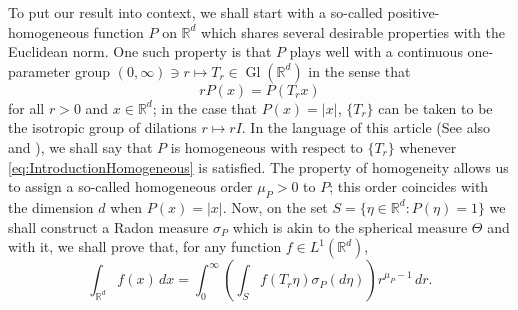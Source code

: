 \documentclass[11pt]{article}
\newtheorem{theorem}{Theorem}[section]
\theoremstyle{remark}
\newcommand\Gl{\operatorname{Gl}} %
\begin{document}
To put our result into context, we shall start with a so-called positive-homogeneous function $P$ on $\mathbb{R}^d$ which shares several desirable properties with the Euclidean norm. One such property is that $P$ plays well with a continuous one-parameter group $(0,\infty)\ni r\mapsto T_r\in\Gl(\mathbb{R}^d)$ in the sense that
\begin{equation}\label{eq:IntroductionHomogeneous}
    rP(x)=P(T_r x)
\end{equation}
for all $r>0$ and $x\in\mathbb{R}^d$; in the case that $P(x)=|x|$, $\{T_r\}$ can be taken to be the isotropic group of dilations $r\mapsto r I$. In the language of this article (See also \cite{Randles2017} and \cite{Randles2017a}), we shall say that $P$ is homogeneous with respect to $\{T_r\}$ whenever \eqref{eq:IntroductionHomogeneous} is satisfied. The property of homogeneity allows us to assign a so-called homogeneous order $\mu_P>0$ to $P$; this order coincides with the dimension $d$ when $P(x)=|x|$. Now, on the set $S=\{\eta\in\mathbb{R}^d:P(\eta)=1\}$ we shall construct a Radon measure $\sigma_P$ which is akin to the spherical measure $\Theta$ and with it, we shall prove that, for any function $f\in L^1(\mathbb{R}^d)$, 
\begin{equation*}
    \int_{\mathbb{R}^d}f(x)\,dx =\int_0^\infty \left(\int_S f(T_r\eta)\sigma_P(d\eta)\right)r^{\mu_P-1}\,dr.
\end{equation*}

\end{document}
